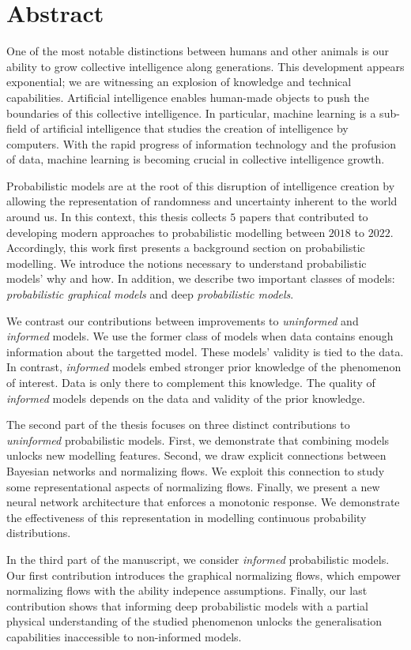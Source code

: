 
\chapter*{Abstract}
One of the most notable distinctions between humans and other animals is our ability to grow collective intelligence along generations. This development appears exponential; we are witnessing an explosion of knowledge and technical capabilities. Artificial intelligence enables human-made objects to push the boundaries of this collective intelligence. In particular, machine learning is a sub-field of artificial intelligence that studies the creation of intelligence by computers. With the rapid progress of information technology and the profusion of data, machine learning is becoming crucial in collective intelligence growth.

Probabilistic models are at the root of this disruption of intelligence creation by allowing the representation of randomness and uncertainty inherent to the world around us. In this context, this thesis collects $5$ papers that contributed to developing modern approaches to probabilistic modelling between $2018$ to $2022$.
Accordingly, this work first presents a background section on probabilistic modelling. We introduce the notions necessary to understand probabilistic models' why and how. In addition, we describe two important classes of models: \textit{probabilistic graphical models} and deep \textit{probabilistic models}.

We contrast our contributions between improvements to \textit{uninformed} and \textit{informed} models. We use the former class of models when data contains enough information about the targetted model. These models' validity is tied to the data. In contrast, \textit{informed} models embed stronger prior knowledge of the phenomenon of interest. Data is only there to complement this knowledge. The quality of \textit{informed} models depends on the data and validity of the prior knowledge.

The second part of the thesis focuses on three distinct contributions to \textit{uninformed} probabilistic models. First, we demonstrate that combining models unlocks new modelling features. Second, we draw explicit connections between Bayesian networks and normalizing flows. We exploit this connection to study some representational aspects of normalizing flows. Finally, we present a new neural network architecture that enforces a monotonic response. We demonstrate the effectiveness of this representation in modelling continuous probability distributions.

In the third part of the manuscript, we consider \textit{informed} probabilistic models. Our first contribution introduces the graphical normalizing flows, which empower normalizing flows with the ability indepence assumptions. Finally, our last contribution shows that informing deep probabilistic models with a partial physical understanding of the studied phenomenon unlocks the generalisation capabilities inaccessible to non-informed models.
